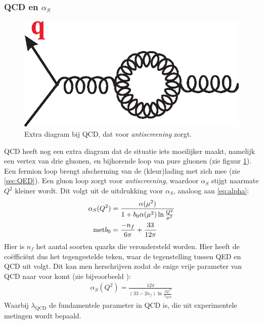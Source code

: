 \documentclass[a4paper,11pt]{article}
\numberwithin{equation}{section} %
\begin{document}
    \subsubsection{QCD en $\alpha_S$}
\begin{figure} [H]
  \begin{center}
    \includegraphics[scale=.33]{Afbeeldingen/GluonLoop.eps}
    \caption{Extra diagram bij QCD, dat voor \textit{antiscreening} zorgt. \cite{Martin}}
   \label{fig:GluonLoop}
  \end{center}
\end{figure}
QCD heeft nog een extra diagram dat de situatie iets moeilijker maakt, namelijk een vertex van drie gluonen, en bijhorende loop van pure gluonen (zie figuur \ref{fig:GluonLoop}).
Een fermion loop brengt afscherming van de (kleur)lading met zich mee (zie \ref{sec:QED}).
Een gluon loop zorgt voor \textit{antiscreening}, waardoor  $\alpha_S$ stijgt naarmate $Q^2$ kleiner wordt.
Dit volgt uit de uitdrukking voor $\alpha_S$, analoog aan \eqref{eq:alpha}:
\begin{align}
\alpha_S( Q^2 ) &=\frac{\alpha(\mu^2)}{1+b_0 \alpha(\mu^2) \ln{\frac{Q^2}{\mu^2}}} \\
\text{met} b_0 &= \frac{-n_f}{6\pi} + \frac{33}{12\pi} \notag
\end{align}
Hier is $n_f$ het aantal soorten quarks die verondersteld worden.
Hier heeft de coëfficiënt dus het tegengestelde teken, waar de tegenstelling tussen QED en QCD uit volgt.
Dit kan men herschrijven zodat de enige vrije parameter van QCD naar voor komt (zie bijvoorbeeld \cite[sectie 6.6]{Bettini}):
\begin{align} \label{eq:runningAlphaS}
\alpha_S(Q^2) = \frac{12\pi}{(33-2n_f) \ln{\frac{|Q|^2}{\lambda_\text{QCD}}}}
\end{align}
Waarbij $\lambda_\text{QCD}$ de fundamentele parameter in QCD is, die uit experimentele metingen wordt bepaald.
\end{document}
